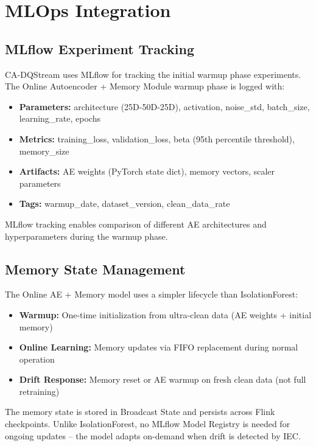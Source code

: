 \section{MLOps Integration}

\subsection{MLflow Experiment Tracking}

CA-DQStream uses MLflow \citep{mlflow2024} for tracking the initial warmup phase experiments. The Online Autoencoder + Memory Module warmup phase is logged with:

\begin{itemize}
    \item \textbf{Parameters:} architecture (25D-50D-25D), activation, noise\_std, batch\_size, learning\_rate, epochs
    \item \textbf{Metrics:} training\_loss, validation\_loss, beta (95th percentile threshold), memory\_size
    \item \textbf{Artifacts:} AE weights (PyTorch state dict), memory vectors, scaler parameters
    \item \textbf{Tags:} warmup\_date, dataset\_version, clean\_data\_rate
\end{itemize}

MLflow tracking enables comparison of different AE architectures and hyperparameters during the warmup phase.

\subsection{Memory State Management}

The Online AE + Memory model uses a simpler lifecycle than IsolationForest:

\begin{itemize}
    \item \textbf{Warmup:} One-time initialization from ultra-clean data (AE weights + initial memory)
    \item \textbf{Online Learning:} Memory updates via FIFO replacement during normal operation
    \item \textbf{Drift Response:} Memory reset or AE warmup on fresh clean data (not full retraining)
\end{itemize}

The memory state is stored in Broadcast State and persists across Flink checkpoints. Unlike IsolationForest, no MLflow Model Registry is needed for ongoing updates -- the model adapts on-demand when drift is detected by IEC.

